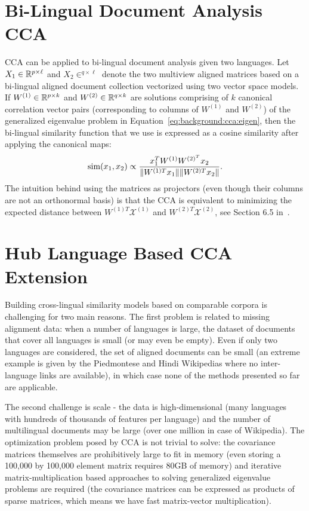 \section{Bi-Lingual Document Analysis CCA}\label{chap:crosslingual:CCA}
CCA can be applied to bi-lingual document analysis given two languages. Let $X_1 \in \mathbb{R}^{p \times \ell}$
and $X_2 \in ^{q \times \ell}$ denote the two multiview aligned matrices based on a bi-lingual aligned
document collection vectorized using two vector space models.
If $W^{(1)}\in \mathbb{R}^{p\times k}$ and $W^{(2)} \in \mathbb{R}^{q\times k}$ are solutions comprising of $k$ canonical
correlation vector pairs (corresponding to columns of $W^{(1)}$ and $W^{(2)}$)
of the generalized eigenvalue problem in Equation~\ref{eq:background:cca:eigen}, then
the bi-lingual similarity function that we use is expressed as a cosine similarity
after applying the canonical maps:
$$\textnormal{sim}(x_1, x_2) \propto \frac{x_1^T W^{(1)}W^{(2)^T}x_2}{\lVert W^{(1)T}x_1\rVert \lVert W^{(2)T}x_2\rVert} .$$
The intuition behind using the matrices as projectors (even though their columns are not an
orthonormal basis) is that the CCA is equivalent to minimizing the expected
distance between $W^{(1)T}\mathcal{X}^{(1)}$ and $W^{(2)T}\mathcal{X}^{(2)}$,
see Section 6.5 in~\cite{shawe-taylor04kernel}.


\section{Hub Language Based CCA Extension}\label{chap:crosslingual:hublang}
Building cross-lingual similarity models based on comparable corpora is challenging for
two main reasons. The first problem is related to missing alignment data: when a number
of languages is large, the dataset of documents that cover all languages is small (or may
even be empty). Even if only two languages are considered, the set of aligned documents
can be small (an extreme example is given by the Piedmontese and Hindi Wikipedias where
no inter-language links are available), in which case none of the methods presented so
far are applicable.

The second challenge is scale - the data is high-dimensional (many languages with
hundreds of thousands of features per language) and the number of multilingual documents may
be large (over one million in case of Wikipedia). The optimization problem posed by CCA is not trivial
to solve: the covariance matrices themselves are prohibitively
large to fit in memory (even storing a 100,000 by 100,000 element matrix requires
80GB of memory) and iterative matrix-multiplication based approaches to solving generalized
eigenvalue problems are required (the covariance matrices can be expressed as products
of sparse matrices, which means we have fast matrix-vector multiplication).

